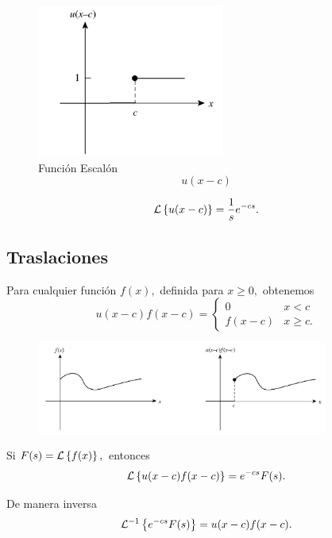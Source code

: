 	\begin{figure}
		\centering
		\includegraphics[height=5cm,keepaspectratio=true]{./edo/img0402.png}
		\caption{Función Escalón $$u(x-c)$$}
		\label{fig:0402}
	\end{figure}




	\begin{teorema}
		\label{bron:thm:23.3}
		$$
		\mathcal{L}\left\{ u(x-c) \right\}=\dfrac{1}{s}e^{-cs}.
		$$
	\end{teorema}


\subsection{Traslaciones}


	Para cualquier funci\'on $f(x),$ definida para $x\geq0,$ obtenemos
	$$
	u(x-c)f(x-c)=
	\begin{cases}
	0 & x<c \\
	f(x-c) & x\geq c.
	\end{cases}
	$$



	\begin{figure}
		\centering
		\includegraphics[height=3cm,keepaspectratio=true]{./edo/img0403.png}
		\label{fig:0403}
	\end{figure}




	\begin{teorema}
		\label{bron:thm:23.4}
		Si $F(s)=\mathcal{L}\left\{ f(x) \right\},$ entonces
		$$
		\mathcal{L}\left\{ u(x-c)f(x-c) \right\}=e^{-cs}F(s).
		$$

		De manera inversa
		$$\mathcal{L}^{-1}\left\{ e^{-cs}F(s) \right\}=u(x-c)f(x-c).$$
	\end{teorema}



